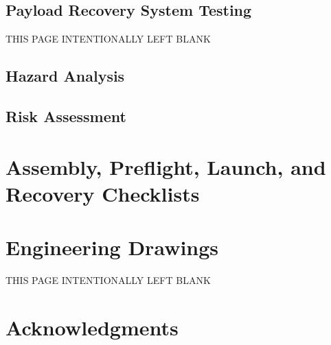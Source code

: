 \documentclass[report]{sac}
\newif\ifwip
\newcommand\putdescription[1]{
\ifwip
    \begingroup
    \small\em
    #1
    \endgroup
\fi}
\newcommand\pageleftblank{
\begin{center}
    \Large
    THIS PAGE INTENTIONALLY LEFT BLANK
\end{center}}
\begin{document}
	\pagebreak
	\subsection{Payload Recovery System Testing}\label{payload-recovery-test}
    \pageleftblank
    
	\begin{landscape}
		\pagebreak
		\section{Hazard Analysis}\label{hazard}
		\putdescription{\HazardAnalysisDescription}

		
	\end{landscape}

    \pagebreak
    
	\begin{landscape}
		\section{Risk Assessment}\label{risk}
		\putdescription{\RiskAssessmentDescription}
	\end{landscape}

	\section{Assembly, Preflight, Launch, and Recovery Checklists} \label{checklists}
	\putdescription{\ChecklistsDescription}

    \pagebreak
	\section{Engineering Drawings} \label{drawings}
	\putdescription{\DrawingsDescription}
    \pageleftblank
    
    
	\pagebreak
	\section*{Acknowledgments}
	\putdescription{\AcknowledgementsDescription}

	

	
\end{document}
